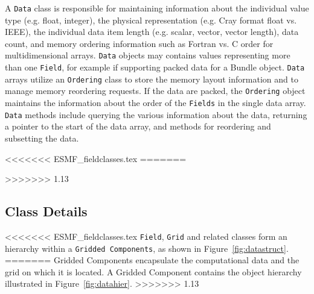 A {\tt Data} class is responsible for maintaining
information about the individual value type (e.g. float, integer), 
the physical representation (e.g. Cray format float vs. IEEE), the 
individual data item length (e.g. scalar, vector, vector length), 
data count, and memory ordering information such as Fortran vs. C order 
for multidimensional arrays.  {\tt Data} objects may contains values 
representing more than one {\tt Field}, for example if supporting
packed data for a Bundle object.
{\tt Data} arrays utilize an {\tt Ordering} class to store the
memory layout information and to manage memory reordering requests.
If the data are packed, the {\tt Ordering} object maintains the information
about the order of the {\tt Fields} in the single data array.
{\tt Data} methods include querying the various information about the
data, returning a pointer to the start of the data
array, and methods for reordering and subsetting the data.

<<<<<<< ESMF_fieldclasses.tex
=======

%

>>>>>>> 1.13
\subsection{Class Details}

<<<<<<< ESMF_fieldclasses.tex
{\tt Field}, {\tt Grid} and related classes form an hierarchy within 
a {\tt Gridded Components}, as shown in Figure~\ref{fig:datastruct}.
=======
Gridded Components encapsulate the computational data and the
grid on which it is located.  A Gridded Component contains
the object hierarchy illustrated in Figure~\ref{fig:datahier}.
>>>>>>> 1.13

